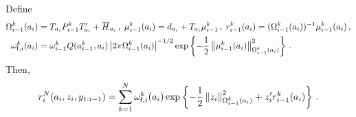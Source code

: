 Define
\begin{align*}
\Omega^k_{i-1}(a_{i}) &= T_{a_{i}}P^k_{i-1}T'_{a_{i}} + \overline{H}_{a_{i}}\,,\;\mu^k_{i-1}(a_{i}) = d_{a_{i}} + T_{a_{i}}\mu^k_{i-1}\,,\;r_{i-1}^k(a_{i}) = (\Omega^k_{i-1}(a_{i}))^{-1}\mu^k_{i-1}(a_{i})\,,\\
\omega_{\mathsf{f},i}^k(a_{i}) &= \omega^k_{i-1}Q(a^k_{i-1},a_{i}) \left|2\pi \Omega^k_{i-1}(a_{i})\right|^{-1/2}\exp\left\{-\frac{1}{2}\left\|\mu^k_{i-1}(a_{i})\right\|_{\Omega^k_{i-1}(a_{i})}^2\right\}\,.
\end{align*}
Then,
\begin{equation}
\label{eq:rN}
r^N_{i}(a_{i},z_{i},y_{1:i-1}) = \sum_{k=1}^N \omega_{\mathsf{f},i}^k(a_{i})\exp\left\{-\frac{1}{2}\normMat{\Omega^k_{i-1}(a_{i})}{z_{i}}^2+z'_{i}r_{i-1}^k(a_{i})\right\}\eqsp.
\end{equation}

